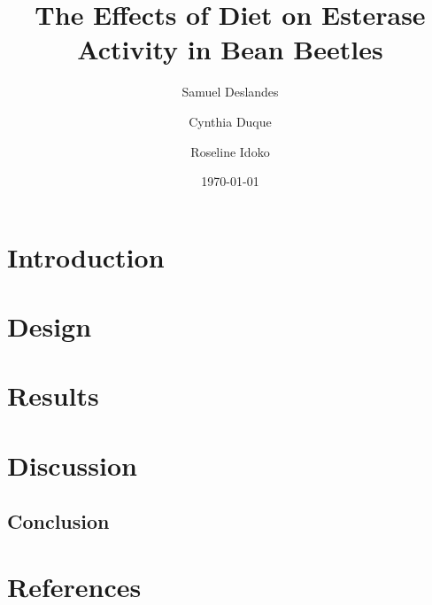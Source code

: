 \documentclass[a4paper]{article}
\title{The Effects of Diet on Esterase Activity in Bean Beetles}
\author{Samuel Deslandes \and Cynthia Duque \and Roseline Idoko}
\date{\today}
\begin{document}
\maketitle

\doublespacing

\section{Introduction} 

\section{Design}

\section{Results}

\section{Discussion}

\subsection{Conclusion}

\section{References}
\end{document}
